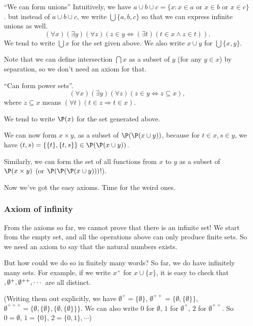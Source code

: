 \documentclass[a4paper]{article}
\begin{document}
\begin{axiom}
  ``We can form unions'' Intuitively, we have $a\cup b\cup c = \{x: x\in a \text{ or }x\in b\text{ or }x\in c\}$. but instead of $a\cup b\cup c$, we write $\bigcup\{a, b, c\}$ so that we can express infinite unions as well.
  \[
    (\forall x)(\exists y)(\forall z)(z\in y \Leftrightarrow (\exists t)(t\in x \wedge z\in t)).
  \]
  We tend to write $\bigcup x$ for the set given above. We also write $x\cup y$ for $\bigcup\{x, y\}$.
\end{axiom}

Note that we can define intersection $\bigcap x$ as a subset of $y$ (for any $y\in x$) by separation, so we don't need an axiom for that.
\begin{axiom}
  ``Can form power sets''.
  \[
    (\forall x)(\exists y)(\forall z)(z\in y \Leftrightarrow z\subseteq x),
  \]
  where $z\subseteq x$ means $(\forall t)(t\in z \Rightarrow t\in x)$.

  We tend to write $\P(x)$ for the set generated above.
\end{axiom}
We can now form $x\times y$, as a subset of $\P(\P(x\cup y))$, because for $t\in x, s\in y$, we have $(t, s) = \{\{t\},\{t, s\}\}\in \P(\P(x\cup y))$.

Similarly, we can form the set of all functions from $x$ to $y$ as a subset of $\P(x\times y)$ (or $\P(\P(\P(x\cup y)))$!).

Now we've got the easy axioms. Time for the weird ones.

\subsubsection*{Axiom of infinity}
From the axioms so far, we cannot prove that there is an infinite set! We start from the empty set, and all the operations above can only produce finite sets. So we need an axiom to say that the natural numbers exists.

But how could we do so in finitely many words? So far, we do have infinitely many sets. For example, if we write $x^+$ for $x\cup \{x\}$, it is easy to check that $\empty, \emptyset^+, \emptyset^{++}, \cdots$ are all distinct.

(Writing them out explicitly, we have $\emptyset^+ = \{\emptyset\}$, $\emptyset^{++} = \{\emptyset, \{\emptyset\}\}$, $\emptyset^{+++} = \{\emptyset, \{\emptyset\}, \{\emptyset, \{\emptyset\}\}\}$. We can also write $0$ for $\emptyset$, $1$ for $\emptyset^{+}$, $2$ for $\emptyset^{++}$. So $0 = \emptyset$, $1 = \{0\}$, $2 = \{0, 1\}, \cdots$)
\end{document}
